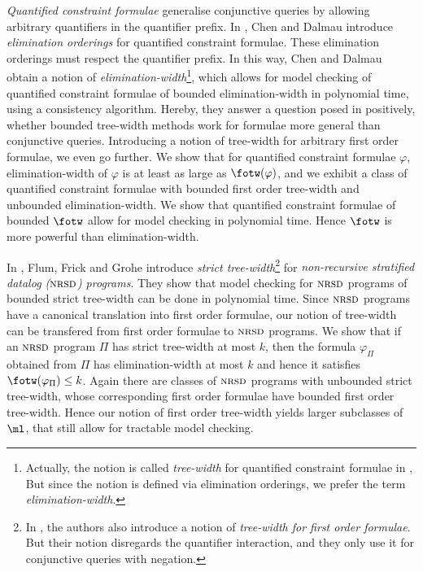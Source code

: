 \documentclass{LMCS}
\newcommand{\nrsd}{\textsc{nrsd}}
\renewcommand{\phi}{\varphi}
\begin{document}
\emph{Quantified constraint formulae} generalise conjunctive queries by allowing
arbitrary quantifiers in the quantifier prefix.  In \cite{chedal05}, Chen
and Dalmau introduce \emph{elimination orderings} for quantified
constraint formulae. 
These elimination orderings must respect the quantifier prefix.
In this way, Chen and Dalmau obtain a notion of \emph{elimination-width}\footnote{Actually, 
the notion is called \emph{tree-width} for quantified constraint formulae in \cite{chedal05}, 
But since the notion is defined via elimination orderings, we prefer the term
\emph{elimination-width}.},
which allows for model checking of quantified constraint formulae of bounded 
elimination-width in polynomial time, using a consistency algorithm. Hereby, they
answer a question posed in \cite{GottlobGS05} positively, whether bounded tree-width methods
work for formulae more general than conjunctive queries. 
Introducing a notion of tree-width 
for arbitrary first order formulae, we even go further.  
We show that for quantified constraint formulae $\phi$, 
elimination-width of $\phi$ is at least as large as $\fotw(\phi)$,
and we exhibit a class of quantified constraint formulae
with bounded first order tree-width and unbounded elimination-width.
We show that quantified constraint formulae of bounded $\fotw$ allow for 
model checking in polynomial time. 
Hence $\fotw$ is more powerful than elimination-width. 

In \cite{flufrigro01}, Flum, Frick and Grohe introduce 
\emph{strict tree-width}\footnote{In \cite{flufrigro01}, 
the authors also introduce a notion of \emph{tree-width for first order formulae}. But their notion disregards the quantifier 
interaction, and they only use it
for conjunctive queries with negation.}
for \emph{non-recursive stratified datalog ($\nrsd$) programs}. They show that
model checking for $\nrsd$ programs of bounded strict tree-width can be done
in polynomial time. Since $\nrsd$ programs have a canonical translation
into first order formulae, 
our notion of tree-width can be transfered 
from first order formulae to $\nrsd$ programs. 
We show that if an $\nrsd$ program $\Pi$ 
has strict tree-width at most $k$, then the formula $\phi_{\Pi}$ obtained from
$\Pi$ has elimination-width at most $k$ and hence it 
satisfies $\fotw(\phi_{\Pi})\leq k$. 
Again there are classes of $\nrsd$ programs with unbounded strict tree-width, 
whose corresponding first order formulae have bounded first order 
tree-width.  Hence our notion of
first order tree-width yields larger subclasses of $\ml$, that still allow
for tractable model checking.
\end{document}
